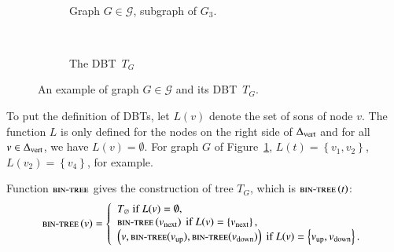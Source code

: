 \documentclass[preprint]{elsarticle}
\newcommand{\set}[1]{\left\{ #1 \right\}}
\newcommand{\mcalg}{\mathcal{G}}
\newcommand{\deltavert}{\Delta_{\mbox{\scriptsize{vert}}}}
\newcommand{\bintree}{\textsc{bin-tree}}
\newcommand{\ebt}{DBT}
\newcommand{\dfs}{L}
\begin{document}
\begin{figure}[h]
\centering
~
\begin{subfigure}[b]{0.46\columnwidth}
\centering
\scalebox{.42}{}
\caption{Graph $G \in \mcalg$, subgraph of $G_3$.}
\label{subfig:ebt_2}
\end{subfigure}
~
\begin{subfigure}[b]{0.46\columnwidth}
\centering
\scalebox{.58}{}
\caption{The \ebt ~$T_G$}
\label{subfig:ebt_3}
\end{subfigure}
\caption{An example of graph $G \in \mcalg$ and its \ebt ~$T_G$.}
\label{fig:ebt}
\end{figure}

To put the definition of \ebt s, let $\dfs\left(v\right)$ denote the set of sons of node $v$. The function $\dfs$ is only defined for the nodes on the right side of $\deltavert$ and for all $v \in \deltavert$, we have $L\left(v\right) = \emptyset$. For graph $G$ of Figure~\ref{subfig:ebt_2}, $\dfs\left(t\right) = \set{v_1,v_2}$, $\dfs\left(v_2\right) = \set{v_4}$, for example. 

Function $\bintree$ gives the construction of tree $T_G$, which is $\bintree \left(t\right)$:
\[
\bintree\left(v\right) = 
\left\{
\begin{array}{l}
T_\varnothing ~\mbox{if}~ \dfs(v) = \emptyset,\\
\bintree\left(v_{\mbox{\scriptsize{next}}}\right)  ~\mbox{if}~ \dfs(v) = \set{v_{\mbox{\scriptsize{next}}}},\\
\left(v, \bintree(v_{\mbox{\scriptsize{up}}}), \bintree( v_{\mbox{\scriptsize{down}}})\right) ~\mbox{if}~ \dfs(v) = \set{v_{\mbox{\scriptsize{up}}},v_{\mbox{\scriptsize{down}}}}.
\end{array}
\right.
\]
\end{document}
